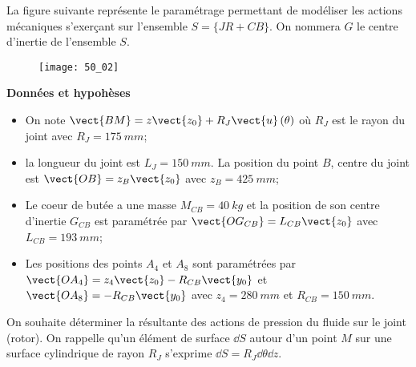 \normaltrue \difficilefalse \tdifficilefalse
\correctionfalse


\setcounter{question}{0}
\ifcorrection
\else
{}
\fi
\ifprof
\else


\ifprof
\else
La figure suivante représente le paramétrage permettant de modéliser les actions mécaniques
s’exerçant sur l’ensemble $S=\{JR+CB\}$. On nommera $G$ le centre d’inertie de l’ensemble
$S$.


\begin{figure}[H]
\centering
\texttt{[image: 50\_02]}
\end{figure}
\fi

\textbf{Données et hypohèses}

\begin{itemize}
\item On note $\vect{BM}=z\vect{z_0}+R_J\vect{u}\left(\theta\right)$ où $R_J$ est le rayon du joint avec $R_J = \SI{175}{mm}$;
\item la longueur du joint est $L_J = \SI{150}{mm}$. La position du point $B$, centre du joint est $\vect{OB}=z_B\vect{z_0}$ avec $z_B = \SI{425}{mm}$;
\item Le coeur de butée a une masse $M_{CB} = \SI{40}{kg}$ et la position de son centre d’inertie $G_{CB}$ est paramétrée par $\vect{OG_{CB}}= L_{CB}\vect{z_0}$ avec $L_{CB} = \SI{193}{mm}$;
\item Les positions des points $A_4$ et $A_8$ sont paramétrées par $\vect{OA_4} = z_4\vect{z_0}-R_{CB}\vect{y_0}$ et
$\vect{OA_8}=-R_{CB}\vect{y_0}$ avec $z_4 = \SI{280}{mm}$ et $R_{CB}=\SI{150}{mm}$.
\end{itemize}


On souhaite déterminer la résultante des actions de pression du fluide sur le joint (rotor).
On rappelle qu’un élément de surface $\dd S$ autour d’un point $M$ sur une surface cylindrique
de rayon $R_J$ s’exprime $\dd S = R_J \dd \theta \dd z$.

